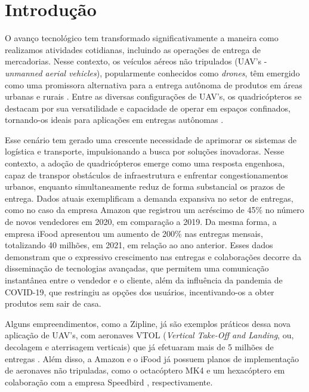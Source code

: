 \documentclass[main.tex]{subfiles}
\begin{document}
\chapter{Introdução}\label{chap:introducao}

O avanço tecnológico tem transformado significativamente a maneira como realizamos atividades cotidianas, incluindo as operações de entrega de mercadorias. Nesse contexto, os veículos aéreos não tripulados (UAV's - \textit{unmanned aerial vehicles}), popularmente conhecidos como \textit{drones}, têm emergido como uma promissora alternativa para a entrega autônoma de produtos em áreas urbanas e rurais \cite{intro:1}. Entre as diversas configurações de UAV's, os quadricópteros se destacam por sua versatilidade e capacidade de operar em espaços confinados, tornando-os ideais para aplicações em entregas autônomas \cite{intro:2}.

Esse cenário tem gerado uma crescente necessidade de aprimorar os sistemas de logística e transporte, impulsionando a busca por soluções inovadoras. Nesse contexto, a adoção de quadricópteros emerge como uma resposta engenhosa, capaz de transpor obstáculos de infraestrutura e enfrentar congestionamentos urbanos, enquanto simultaneamente reduz de forma substancial os prazos de entrega. Dados atuais exemplificam a demanda expansiva no setor de entregas, como no caso da empresa Amazon que registrou um acréscimo de 45\% \cite{amazon:num_entregas} no número de novos vendedores em 2020, em comparação a 2019. Da mesma forma, a empresa iFood apresentou um aumento de 200\% \cite{ifood:num_entregas} nas entregas mensais, totalizando 40 milhões, em 2021, em relação ao ano anterior. Esses dados demonstram que o expressivo crescimento nas entregas e colaborações decorre da disseminação de tecnologias avançadas, que permitem uma comunicação instantânea entre o vendedor e o cliente, além da influência da pandemia de COVID-19, que restringiu as opções dos usuários, incentivando-os a obter produtos sem sair de casa.

Alguns empreendimentos, como a Zipline, já são exemplos práticos dessa nova aplicação de UAV's, com aeronaves VTOL (\textit{Vertical Take-Off and Landing}, ou, decolagem e aterrisagem verticais) que já efetuaram mais de 5 milhões de entregas \cite{zipline:drone}. Além disso, a Amazon e o iFood já possuem planos de implementação de aeronaves não tripuladas, como o octacóptero MK4 \cite{amazon:drone} e um hexacóptero em colaboração com a empresa Speedbird \cite{ifood:drone}, respectivamente.
\end{document}

